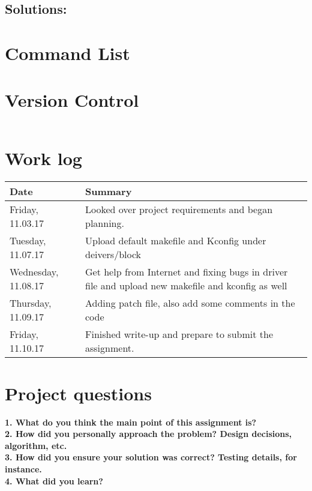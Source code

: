 \documentclass[10pt,letterpaper]{article}
\begin{document}
\subsection{Solutions:}


\textbf{}

\section*{Command List}



\section{Version Control}

\textbf{}

\begin{tabular}{|l|l|l|p{8cm}|} \hline


\end{tabular}

\section{Work log}

\textbf{}

\begin{tabular}{|l|p{12cm}|} \hline
Date & Summary\\ \hline
Friday, 11.03.17 & Looked over project requirements and began planning.\\ \hline
Tuesday, 11.07.17 & Upload default makefile and Kconfig under deivers/block\\ \hline
Wednesday, 11.08.17 & Get help from Internet and fixing bugs in driver file and upload new makefile and kconfig as well \\ \hline
Thursday, 11.09.17 & Adding patch file, also add some comments in the code \\ \hline
Friday, 11.10.17 &  Finished write-up and prepare to submit the assignment.\\ \hline

\end{tabular}

\section{Project questions}

\textbf{}

\textbf{1. What do you think the main point of this assignment is?}\\



\textbf{2. How did you personally approach the problem? Design decisions, algorithm, etc.}\\


\textbf{3. How did you ensure your solution was correct? Testing details, for instance.}\\



\textbf{4. What did you learn?}\\
\end{document}
